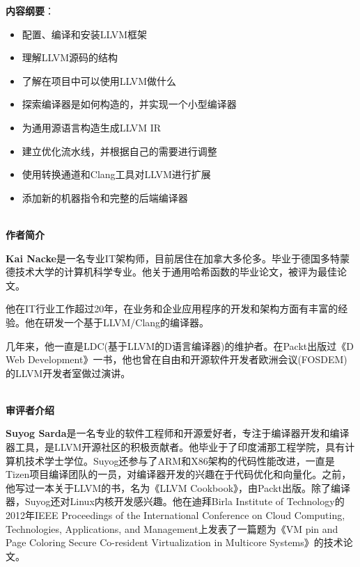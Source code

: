 \documentclass[11pt,a4paper,UTF8]{ctexart}
\begin{document}
	\textbf{内容纲要}：\par
	
	\begin{itemize}
		\item 配置、编译和安装LLVM框架
		\item 理解LLVM源码的结构
		\item 了解在项目中可以使用LLVM做什么
		\item 探索编译器是如何构造的，并实现一个小型编译器
		\item 为通用源语言构造生成LLVM IR
		\item 建立优化流水线，并根据自己的需要进行调整
		\item 使用转换通道和Clang工具对LLVM进行扩展
		\item 添加新的机器指令和完整的后端编译器
	\end{itemize}
	
	
	\hspace*{\fill} \\ %
	\noindent\textbf{作者简介}\ \par
	
	\textbf{Kai Nacke}是一名专业IT架构师，目前居住在加拿大多伦多。毕业于德国多特蒙德技术大学的计算机科学专业。他关于通用哈希函数的毕业论文，被评为最佳论文。\par
	
	他在IT行业工作超过20年，在业务和企业应用程序的开发和架构方面有丰富的经验。他在研发一个基于LLVM/Clang的编译器。\par
	
	几年来，他一直是LDC(基于LLVM的D语言编译器)的维护者。在Packt出版过《D Web Development》一书，他也曾在自由和开源软件开发者欧洲会议(FOSDEM)的LLVM开发者室做过演讲。\par
	
	\hspace*{\fill} \\ %
	\noindent\textbf{审评者介绍}\ \par
	
	\textbf{Suyog Sarda}是一名专业的软件工程师和开源爱好者，专注于编译器开发和编译器工具，是LLVM开源社区的积极贡献者。他毕业于了印度浦那工程学院，具有计算机技术学士学位。Suyog还参与了ARM和X86架构的代码性能改进，一直是Tizen项目编译团队的一员，对编译器开发的兴趣在于代码优化和向量化。之前，他写过一本关于LLVM的书，名为《LLVM Cookbook》，由Packt出版。除了编译器，Suyog还对Linux内核开发感兴趣。他在迪拜Birla Institute of Technology的2012年IEEE Proceedings of the International Conference on Cloud Computing, Technologies, Applications, and Management上发表了一篇题为《VM pin and Page Coloring Secure Co-resident Virtualization in Multicore Systems》的技术论文。
\end{document}
